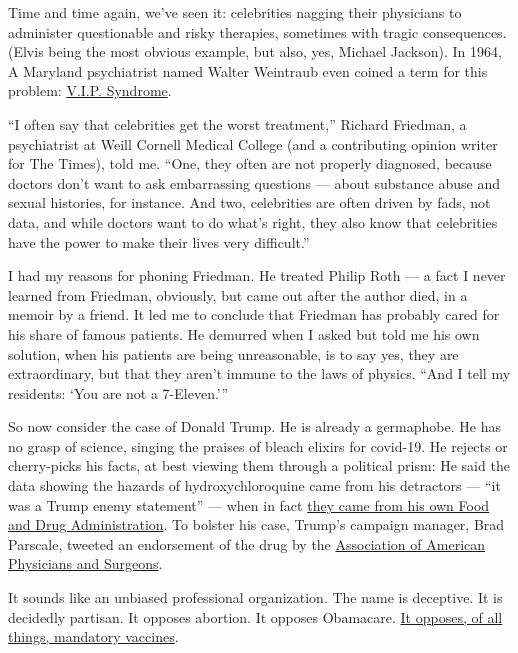 Time and time again, we've seen it: celebrities nagging their physicians
to administer questionable and risky therapies, sometimes with tragic
consequences. (Elvis being the most obvious example, but also, yes,
Michael Jackson). In 1964, A Maryland psychiatrist named Walter
Weintraub even coined a term for this problem:
\href{https://journals.lww.com/jonmd/Citation/1964/02000/_The_Vip_Syndrome___A_Clinical_Study_in_Hospital.12.aspx}{V.I.P.
Syndrome}.

``I often say that celebrities get the worst treatment,'' Richard
Friedman, a psychiatrist at Weill Cornell Medical College (and a
contributing opinion writer for The Times), told me. ``One, they often
are not properly diagnosed, because doctors don't want to ask
embarrassing questions --- about substance abuse and sexual histories,
for instance. And two, celebrities are often driven by fads, not data,
and while doctors want to do what's right, they also know that
celebrities have the power to make their lives very difficult.''

I had my reasons for phoning Friedman. He treated Philip Roth --- a fact
I never learned from Friedman, obviously, but came out after the author
died, in a memoir by a friend. It led me to conclude that Friedman has
probably cared for his share of famous patients. He demurred when I
asked but told me his own solution, when his patients are being
unreasonable, is to say yes, they are extraordinary, but that they
aren't immune to the laws of physics. ``And I tell my residents: `You
are not a 7-Eleven.'''

So now consider the case of Donald Trump. He is already a germaphobe. He
has no grasp of science, singing the praises of bleach elixirs for
covid-19. He rejects or cherry-picks his facts, at best viewing them
through a political prism: He said the data showing the hazards of
hydroxychloroquine came from his detractors --- ``it was a Trump enemy
statement'' --- when in fact
\href{https://www.vox.com/2020/5/19/21263989/trump-hydroxychloroquine-study-enemy-statement-fda}{they
came from his own Food and Drug Administration}. To bolster his case,
Trump's campaign manager, Brad Parscale, tweeted an endorsement of the
drug by the
\href{https://aapsonline.org/hcq-90-percent-chance/}{Association of
American Physicians and Surgeons}.

It sounds like an unbiased professional organization. The name is
deceptive. It is decidedly partisan. It opposes abortion. It opposes
Obamacare.
\href{https://aapsonline.org/measles-outbreak-and-federal-vaccine-mandates/}{It
opposes, of all things, mandatory vaccines}.

